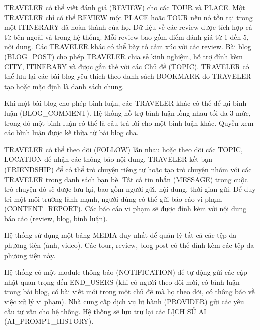 TRAVELER có thể viết đánh giá (REVIEW) cho các TOUR và PLACE. Một TRAVELER chỉ có thể REVIEW một PLACE hoặc TOUR nếu nó tồn tại trong một ITINERARY đã hoàn thành của họ. Dữ liệu về các review được tích hợp cả từ bên ngoài và trong hệ thống. Mỗi review bao gồm điểm đánh giá từ 1 đến 5, nội dung. Các TRAVELER khác có thể bày tỏ cảm xúc với các review. 
Bài blog (BLOG\_POST) cho phép TRAVELER chia sẻ kinh nghiệm, hỗ trợ đính kèm CITY, ITINERARY và được gắn thẻ với các Chủ đề (TOPIC). TRAVELER có thể lưu lại các bài blog yêu thích theo danh sách BOOKMARK do TRAVELER tạo hoặc mặc định là danh sách chung.

Khi một bài blog cho phép bình luận, các TRAVELER khác có thể để lại bình luận (BLOG\_COMMENT). Hệ thống hỗ trợ bình luận lồng nhau tối đa 3 mức, trong đó một bình luận có thể là câu trả lời cho một bình luận khác. Quyền xem các bình luận được kế thừa từ bài blog cha.

TRAVELER có thể theo dõi (FOLLOW) lẫn nhau hoặc theo dõi các TOPIC, LOCATION để nhận các thông báo nội dung.
TRAVELER kết bạn (FRIENDSHIP) để có thể trò chuyện riêng tư hoặc tạo trò chuyện nhóm  với các TRAVELER trong danh sách bạn bè. Tất cả tin nhắn (MESSAGE) trong cuộc trò chuyện đó sẽ được lưu lại, bao gồm người gửi, nội dung, thời gian gửi.
Để duy trì một môi trường lành mạnh, người dùng có thể gửi báo cáo vi phạm (CONTENT\_REPORT). Các báo cáo vi phạm sẽ được đính kèm với nội dung báo cáo (review, blog, bình luận).

Hệ thống sử dụng một bảng MEDIA duy nhất để quản lý tất cả các tệp đa phương tiện (ảnh, video). Các tour, review, blog post có thể đính kèm các tệp đa phương tiện này.

Hệ thống có một module thông báo (NOTIFICATION) để tự động gửi các cập nhật quan trọng đến END\_USERS (khi có người theo dõi mới, có bình luận trong bài blog, có bài viết mới trong một chủ đề mà họ theo dõi, có thông báo về việc xử lý vi phạm).
Nhà cung cấp dịch vụ lữ hành (PROVIDER) gửi các yêu cầu tư vấn cho hệ thống. Hệ thống sẽ lưu trữ lại các LỊCH SỬ AI (AI\_PROMPT\_HISTORY).

